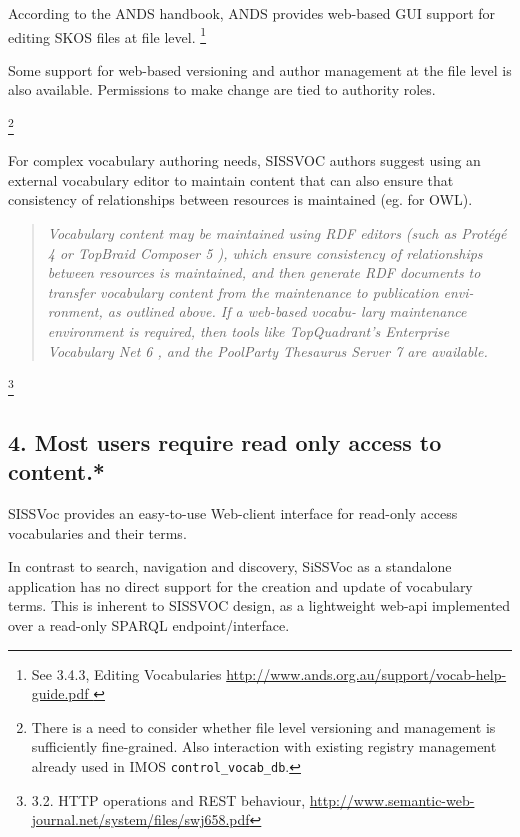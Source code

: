\documentclass[10pt,a4paper]{article}
\newenvironment{italicquotes}
{\begin{quote}\itshape}
{\end{quote}}
\begin{document}
\begin{flushleft}
%    
  According to the ANDS handbook, ANDS provides web-based GUI support for editing SKOS files at file level. 
  \footnote { See 3.4.3, Editing Vocabularies \url{ http://www.ands.org.au/support/vocab-help-guide.pdf } 
  }

  Some support for web-based versioning and author management at the file level
is also available. Permissions to make change are tied to authority roles.

  \footnote {
    There is a need to consider whether file level versioning and management is
  sufficiently fine-grained. Also interaction with existing registry management
  already used in IMOS \texttt{control\_vocab\_db}. 
  }
  
  For complex vocabulary authoring needs, SISSVOC authors suggest using an
external vocabulary editor to maintain content that can also ensure that consistency of
relationships between resources is maintained (eg. for OWL). 

  \begin{italicquotes} 
  Vocabulary content may be maintained using RDF editors (such as Protégé 4 or
TopBraid Composer 5 ), which ensure consistency of
relationships between resources is maintained, and
then generate RDF documents to transfer vocabulary
content from the maintenance to publication envi-
ronment, as outlined above. If a web-based vocabu-
lary maintenance environment is required, then tools
like TopQuadrant’s Enterprise Vocabulary Net 6 , and
the PoolParty Thesaurus Server 7 are available.
  \end{italicquotes} 

  \footnote {
    3.2. HTTP operations and REST behaviour, 
\url{http://www.semantic-web-journal.net/system/files/swj658.pdf} 
  }


\subsection{ 
  4. Most users require read only access to content.* 
}
  SISSVoc provides an easy-to-use Web-client interface for read-only access vocabularies and their terms.

  In contrast to search, navigation and discovery, SiSSVoc as a standalone application has no direct 
  support for the creation and update of vocabulary terms. This is inherent to SISSVOC design, as a 
  lightweight web-api implemented over a read-only SPARQL endpoint/interface.  


\end{flushleft}
\end{document}
